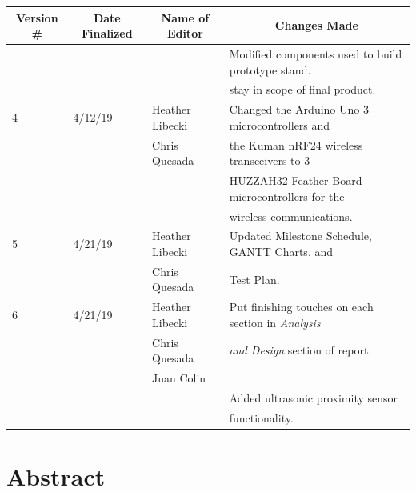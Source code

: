 \thispagestyle{empty}      
\begin{table} [H]	
	\normalsize
	\centering
	\begin{tabular}{|l|l|l|l|}
		\hline
		\multicolumn{1}{|c|}{\textbf{Version \#}} & 
		\multicolumn{1}{|c|}{\textbf{Date Finalized}} &
		\multicolumn{1}{|c|}{\textbf{Name of Editor}} & 
		\multicolumn{1}{|c|}{\textbf{Changes Made}} \\
		\hline
		&         		 &              			   & Modified components used to build prototype stand. \\
 	    &          		 &                			   & stay in scope of final product.\\
 	      \hline
	 4 & 4/12/19  	 & Heather Libecki 		   & Changed the Arduino Uno 3 microcontrollers and  \\ 
	    &          		 & Chris Quesada   		   & the Kuman nRF24 wireless transceivers to 3  \\
	    &        		 &                 			   & HUZZAH32 Feather Board microcontrollers for the  \\ 	
	    &         		 &                			   & wireless communications.	\\      
 	      \hline
 	 5 & 4/21/19  	 & Heather Libecki		   & Updated Milestone Schedule, GANTT Charts, and \\ 
 	    &         		 & Chris Quesada  		   & Test Plan.	\\ 	
 	    \hline
 	 6 & 4/21/19  	 & Heather Libecki		   & Put finishing touches on each section in \textit{Analysis}\\ 
 	    &         		 & Chris Quesada  		   & \textit{and Design} section of report.\\
 	    &				 & Juan Colin			& \\
 	    &				&						&	Added ultrasonic proximity sensor \\
 	    &                &                      & functionality.\\
	      
		\hline
	\end{tabular} 
\end{table}
 \newpage
 \thispagestyle{empty}
 \section*{Abstract}

